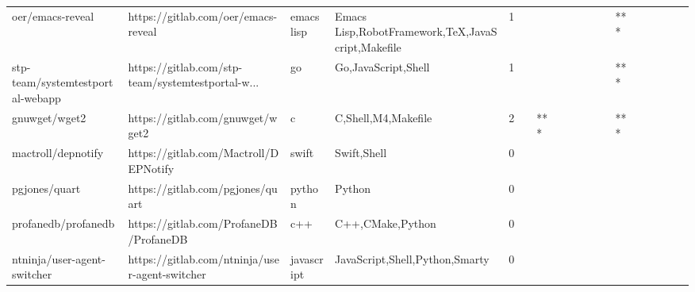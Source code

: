 \begin{tabular}{llllrlllllllllllll}
oer/emacs-reveal                                   &                https://gitlab.com/oer/emacs-reveal &        emacs lisp &  Emacs Lisp,RobotFramework,TeX,JavaScript,Makefile &       1 &         &        &           &                &                 &        &           &       *** &          &          &       &              &          \\
stp-team/systemtestportal-webapp                   &  https://gitlab.com/stp-team/systemtestportal-w... &                go &                                Go,JavaScript,Shell &       1 &         &        &           &                &                 &        &           &       *** &          &          &       &              &          \\
gnuwget/wget2                                      &                   https://gitlab.com/gnuwget/wget2 &                 c &                                C,Shell,M4,Makefile &       2 &         &    *** &           &                &                 &        &           &       *** &          &          &       &              &          \\
mactroll/depnotify                                 &              https://gitlab.com/Mactroll/DEPNotify &             swift &                                        Swift,Shell &       0 &         &        &           &                &                 &        &           &           &          &          &       &              &          \\
pgjones/quart                                      &                   https://gitlab.com/pgjones/quart &            python &                                             Python &       0 &         &        &           &                &                 &        &           &           &          &          &       &              &          \\
profanedb/profanedb                                &             https://gitlab.com/ProfaneDB/ProfaneDB &               c++ &                                   C++,CMake,Python &       0 &         &        &           &                &                 &        &           &           &          &          &       &              &          \\
ntninja/user-agent-switcher                        &     https://gitlab.com/ntninja/user-agent-switcher &        javascript &                     JavaScript,Shell,Python,Smarty &       0 &         &        &           &                &                 &        &           &           &          &          &       &              &          \\

\end{tabular}
